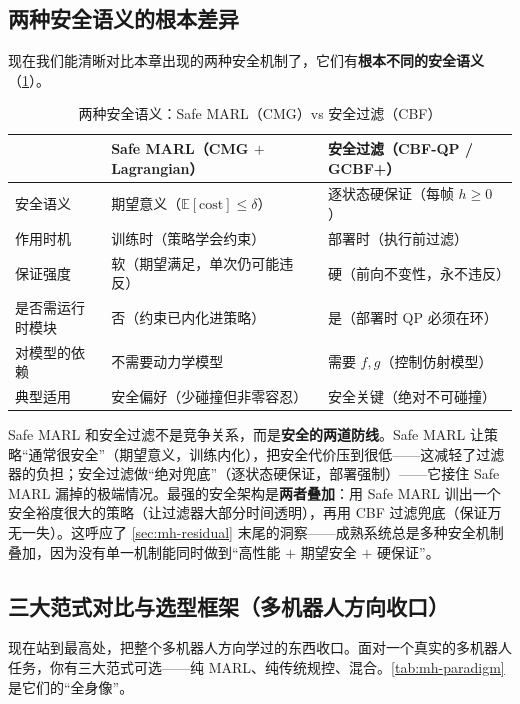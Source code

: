 \subsection{两种安全语义的根本差异}
\label{sec:mh-two-semantics}

现在我们能清晰对比本章出现的两种安全机制了，它们有\textbf{根本不同的安全语义}（\cref{tab:mh-two-safety}）。

\begin{table}[H]\centering\small
\caption{两种安全语义：Safe MARL（CMG）vs 安全过滤（CBF）}
\label{tab:mh-two-safety}
\begin{tabular}{p{3.0cm}p{4.6cm}p{4.4cm}}
\toprule
 & Safe MARL（CMG $+$ Lagrangian） & 安全过滤（CBF-QP / GCBF+） \\
\midrule
安全语义 & 期望意义（$\mathbb{E}[\text{cost}]\le\delta$） & 逐状态硬保证（每帧 $h\ge0$） \\
作用时机 & 训练时（策略学会约束） & 部署时（执行前过滤） \\
保证强度 & 软（期望满足，单次仍可能违反） & 硬（前向不变性，永不违反） \\
是否需运行时模块 & 否（约束已内化进策略） & 是（部署时 QP 必须在环） \\
对模型的依赖 & 不需要动力学模型 & 需要 $f,g$（控制仿射模型） \\
典型适用 & 安全偏好（少碰撞但非零容忍） & 安全关键（绝对不可碰撞） \\
\bottomrule
\end{tabular}
\end{table}

\begin{insight}
Safe MARL 和安全过滤不是竞争关系，而是\textbf{安全的两道防线}。Safe MARL 让策略“通常很安全”（期望意义，训练内化），把安全代价压到很低——这减轻了过滤器的负担；安全过滤做“绝对兜底”（逐状态硬保证，部署强制）——它接住 Safe MARL 漏掉的极端情况。最强的安全架构是\textbf{两者叠加}：用 Safe MARL 训出一个安全裕度很大的策略（让过滤器大部分时间透明），再用 CBF 过滤兜底（保证万无一失）。这呼应了 \cref{sec:mh-residual} 末尾的洞察——成熟系统总是多种安全机制叠加，因为没有单一机制能同时做到“高性能 $+$ 期望安全 $+$ 硬保证”。
\end{insight}

\subsection{三大范式对比与选型框架（多机器人方向收口）}
\label{sec:mh-selection}

现在站到最高处，把整个多机器人方向学过的东西收口。面对一个真实的多机器人任务，你有三大范式可选——纯 MARL、纯传统规控、混合。\cref{tab:mh-paradigm} 是它们的“全身像”。

